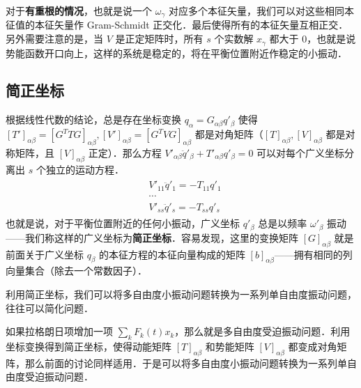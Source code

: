 对于\textbf{有重根的情况}，也就是说一个 $\omega_\gamma$ 对应多个本征矢量，我们可以对这些相同本征值的本征矢量作 Gram-Schmidt 正交化．最后使得所有的本征矢量互相正交．另外需要注意的是，当 $V$ 是正定矩阵时，所有 $s$ 个实数解 $x_\gamma$ 都大于 $0$，也就是说势能函数开口向上，这样的系统是稳定的，将在平衡位置附近作稳定的小振动．

\subsection{简正坐标}

根据线性代数的结论，总是存在坐标变换 $q_\alpha=G_{\alpha\beta}q'_\beta$ 使得 $[T']_{\alpha\beta}=[G^T T G]_{\alpha\beta},[V']_{\alpha\beta}=[G^T V G]_{\alpha\beta} $ 都是对角矩阵（$[T]_{\alpha\beta},[V]_{\alpha\beta}$ 都是对称矩阵，且 $[V]_{\alpha\beta}$ 正定）．那么方程 $V'_{\alpha\beta}\ddot{q}'_\beta+T'_{\alpha\beta}q'_\beta=0$ 可以对每个广义坐标分离出 $s$ 个独立的运动方程．
\begin{align}
\begin{matrix}
&V'_{11}\ddot{q}'_1=-T_{11}q'_1\\
&\cdots\\
&V'_{ss}\ddot{q}'_s=-T_{ss}q'_s
\end{matrix}
\end{align}
也就是说，对于平衡位置附近的任何小振动，广义坐标 $q'_\beta$ 总是以频率 $\omega'_\beta$ 振动——我们称这样的广义坐标为\textbf{简正坐标}．容易发现，这里的变换矩阵 $[G]_{\alpha\beta}$ 就是前面关于广义坐标 $q_\beta$ 的本征方程的本征向量构成的矩阵 $[b]_{\alpha\beta}$——拥有相同的列向量集合（除去一个常数因子）．

利用简正坐标，我们可以将多自由度小振动问题转换为一系列单自由度振动问题，往往可以简化问题．

如果拉格朗日项增加一项 $\sum_k F_k(t)x_k$，那么就是多自由度受迫振动问题．利用坐标变换得到简正坐标，使得动能矩阵 $[T]_{\alpha\beta}$ 和势能矩阵 $[V]_{\alpha\beta}$ 都变成对角矩阵，那么前面的讨论同样适用．于是可以将多自由度小振动问题转换为一系列单自由度受迫振动问题．
